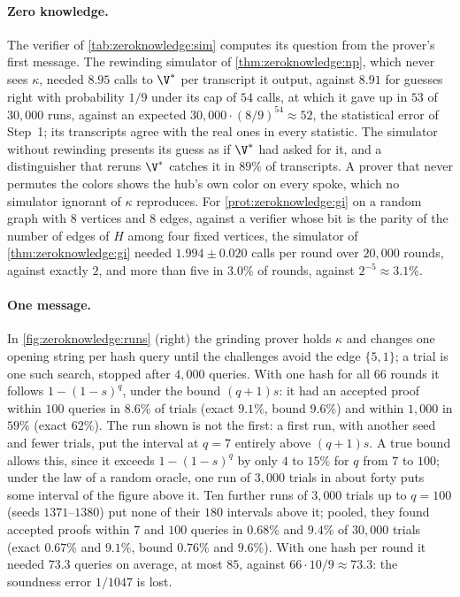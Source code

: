 \begin{refsection}
\paragraph{Zero knowledge.} The verifier of \cref{tab:zeroknowledge:sim} computes its question from the prover's first message. The rewinding simulator of \cref{thm:zeroknowledge:np}, which never sees $\kappa$, needed $8.95$ calls to $\V^*$ per transcript it output, against $8.91$ for guesses right with probability $1/9$ under its cap of $54$ calls, at which it gave up in $53$ of $30{,}000$ runs, against an expected $30{,}000\cdot(8/9)^{54}\approx52$, the statistical error of Step~1; its transcripts agree with the real ones in every statistic. The simulator without rewinding presents its guess as if $\V^*$ had asked for it, and a distinguisher that reruns $\V^*$ catches it in $89\%$ of transcripts. A prover that never permutes the colors shows the hub's own color on every spoke, which no simulator ignorant of $\kappa$ reproduces. For \cref{prot:zeroknowledge:gi} on a random graph with $8$ vertices and $8$ edges, against a verifier whose bit is the parity of the number of edges of $H$ among four fixed vertices, the simulator of \cref{thm:zeroknowledge:gi} needed $1.994\pm0.020$ calls per round over $20{,}000$ rounds, against exactly $2$, and more than five in $3.0\%$ of rounds, against $2^{-5}\approx3.1\%$.

\paragraph{One message.} In \cref{fig:zeroknowledge:runs} (right) the grinding prover holds $\kappa$ and changes one opening string per hash query until the challenges avoid the edge $\{5,1\}$; a trial is one such search, stopped after $4{,}000$ queries. With one hash for all $66$ rounds it follows $1-(1-s)^q$, under the bound $(q+1)s$: it had an accepted proof within $100$ queries in $8.6\%$ of trials (exact $9.1\%$, bound $9.6\%$) and within $1{,}000$ in $59\%$ (exact $62\%$). The run shown is not the first: a first run, with another seed and fewer trials, put the interval at $q=7$ entirely above $(q+1)s$. A true bound allows this, since it exceeds $1-(1-s)^q$ by only $4$ to $15\%$ for $q$ from $7$ to $100$; under the law of a random oracle, one run of $3{,}000$ trials in about forty puts some interval of the figure above it. Ten further runs of $3{,}000$ trials up to $q=100$ (seeds $1371$--$1380$) put none of their $180$ intervals above it; pooled, they found accepted proofs within $7$ and $100$ queries in $0.68\%$ and $9.4\%$ of $30{,}000$ trials (exact $0.67\%$ and $9.1\%$, bound $0.76\%$ and $9.6\%$). With one hash per round it needed $73.3$ queries on average, at most $85$, against $66\cdot10/9\approx73.3$: the soundness error $1/1047$ is lost.


\end{refsection}
